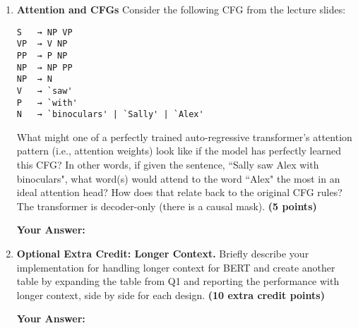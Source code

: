 \documentclass[11pt]{article}
\begin{document}
\begin{enumerate}[label=\textbf{\arabic*.}]
\item \textbf{Attention and CFGs} Consider the following CFG from the lecture slides:
\begin{verbatim}
S   → NP VP  
VP  → V NP    
PP  → P NP  
NP  → NP PP  
NP  → N  
V   → `saw'  
P   → `with'  
N   → `binoculars' | `Sally' | `Alex'
\end{verbatim}
What might one of a perfectly trained auto-regressive transformer's attention pattern (i.e., attention weights) look like if the model has perfectly learned this CFG? In other words, if given the sentence, ``Sally saw Alex with binoculars", what word(s) would attend to the word ``Alex" the most in an ideal attention head? How does that relate back to the original CFG rules? The transformer is decoder-only (there is a causal mask). \textbf{(5 points)}

\newpage
\textbf{Your Answer:}
\begin{framed}
\vspace{32em}
\end{framed}

\item \textbf{Optional Extra Credit: Longer Context.}  
Briefly describe your implementation for handling longer context for BERT and create another table by expanding the table from Q1 and reporting the performance with longer context, side by side for each design. 
\textbf{(10 extra credit points)}

\newpage
\textbf{Your Answer:}
\begin{framed}
\vspace{32em}
\end{framed}

\end{enumerate}
\end{document}
